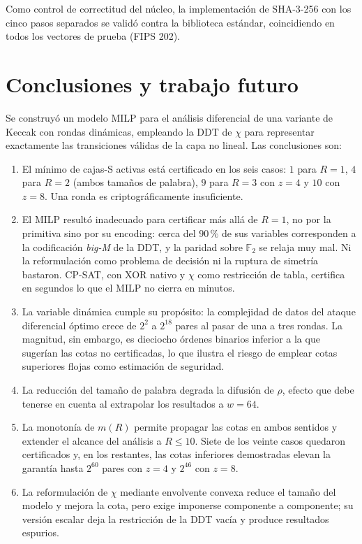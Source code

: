\documentclass[conference]{IEEEtran}
\newcommand{\Fdos}{\mathbb{F}_2}
\begin{document}
Como control de correctitud del núcleo, la implementación de SHA-3-256 con los cinco
pasos separados se validó contra la biblioteca estándar, coincidiendo en todos los
vectores de prueba (FIPS 202).

\section{Conclusiones y trabajo futuro}

Se construyó un modelo MILP para el análisis diferencial de una variante de Keccak con
rondas dinámicas, empleando la DDT de $\chi$ para representar exactamente las
transiciones válidas de la capa no lineal. Las conclusiones son:

\begin{enumerate}
\item El mínimo de cajas-S activas está certificado en los seis casos: $1$ para $R=1$, $4$
para $R=2$ (ambos tamaños de palabra), $9$ para $R=3$ con $z=4$ y $10$ con $z=8$. Una ronda
es criptográficamente insuficiente.
\item El MILP resultó inadecuado para certificar más allá de $R=1$, no por la primitiva
sino por su encoding: cerca del $90\,\%$ de sus variables corresponden a la codificación
\emph{big-M} de la DDT, y la paridad sobre $\Fdos$ se relaja muy mal. Ni la reformulación
como problema de decisión ni la ruptura de simetría bastaron. CP-SAT, con XOR nativo y
$\chi$ como restricción de tabla, certifica en segundos lo que el MILP no cierra en
minutos.
\item La variable dinámica cumple su propósito: la complejidad de datos del ataque
diferencial óptimo crece de $2^{2}$ a $2^{18}$ pares al pasar de una a tres rondas. La
magnitud, sin embargo, es dieciocho órdenes binarios inferior a la que sugerían las cotas
no certificadas, lo que ilustra el riesgo de emplear cotas superiores flojas como
estimación de seguridad.
\item La reducción del tamaño de palabra degrada la difusión de $\rho$, efecto que debe
tenerse en cuenta al extrapolar los resultados a $w=64$.
\item La monotonía de $m(R)$ permite propagar las cotas en ambos sentidos y extender el
alcance del análisis a $R\le10$. Siete de los veinte casos quedaron certificados y, en los
restantes, las cotas inferiores demostradas elevan la garantía hasta $2^{60}$ pares con
$z=4$ y $2^{46}$ con $z=8$.
\item La reformulación de $\chi$ mediante envolvente convexa reduce el tamaño del modelo
y mejora la cota, pero exige imponerse componente a componente; su versión escalar deja la
restricción de la DDT vacía y produce resultados espurios.
\end{enumerate}
\end{document}
